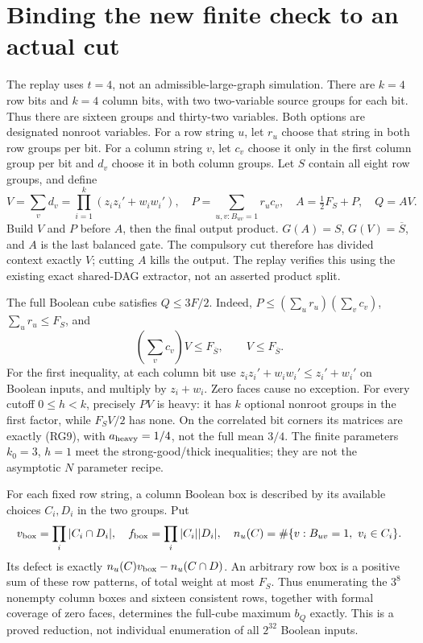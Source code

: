 \documentclass[11pt]{article}
\begin{document}
\section{Binding the new finite check to an actual cut}
The replay uses $t=4$, not an admissible-large-graph simulation.
There are $k=4$ row bits and $k=4$ column bits, with two two-variable
source groups for each bit. Thus there are sixteen groups and
thirty-two variables. Both options are designated nonroot variables.
For a row string $u$, let $r_u$ choose that string in both row groups
per bit. For a column string $v$, let $c_v$ choose it only in the
first column group per bit and $d_v$ choose it in both column groups.
Let $S$ contain all eight row groups, and define
\[
 V=\sum_v d_v=\prod_{i=1}^k(z_i z_i'+w_i w_i'),\quad
 P=\sum_{u,v:B_{uv}=1}r_u c_v,\quad
 A=\tfrac12F_S+P,\quad Q=AV.                            \tag{RG13}
\]
Build $V$ and $P$ before $A$, then the final output product.
$G(A)=S$, $G(V)=\overline S$, and $A$ is the last balanced gate.
The compulsory cut therefore has divided context exactly $V$;
cutting $A$ kills the output. The replay verifies this using the
existing exact shared-DAG extractor, not an asserted product split.

The full Boolean cube satisfies $Q\le3F/2$. Indeed,
$P\le(\sum_u r_u)(\sum_v c_v)$, $\sum_u r_u\le F_S$,
and
\[
 \left(\sum_v c_v\right)V\le F_{\overline S},
 \qquad V\le F_{\overline S}.
\]
For the first inequality, at each column bit use
$z_i z_i'+w_i w_i'\le z_i'+w_i'$ on Boolean inputs, and multiply
by $z_i+w_i$. Zero faces cause no exception.
For every cutoff $0\le h<k$, precisely $PV$ is heavy: it has
$k$ optional nonroot groups in the first factor, while
$F_SV/2$ has none. On the correlated bit corners its matrices
are exactly (RG9), with $a_{\rm heavy}=1/4$, not the full mean $3/4$.
The finite parameters $k_0=3$, $h=1$ meet the strong-good/thick
inequalities; they are not the asymptotic $N$ parameter recipe.

For each fixed row string, a column Boolean box is described by
its available choices $C_i,D_i$ in the two groups.
Put
\[
 v_{\rm box}=\prod_i|C_i\cap D_i|,\quad
 f_{\rm box}=\prod_i|C_i||D_i|,\quad
 n_u(C)=\#\{v:B_{uv}=1,\ v_i\in C_i\}.
\]
Its defect is exactly
$n_u(C)v_{\rm box}-n_u(C\cap D)$.
An arbitrary row box is a positive sum of these row patterns,
of total weight at most $F_S$. Thus enumerating the $3^8$
nonempty column boxes and sixteen consistent rows, together with
formal coverage of zero faces, determines the full-cube maximum
$b_Q$ exactly. This is a proved reduction, not individual enumeration
of all $2^{32}$ Boolean inputs.
\end{document}
